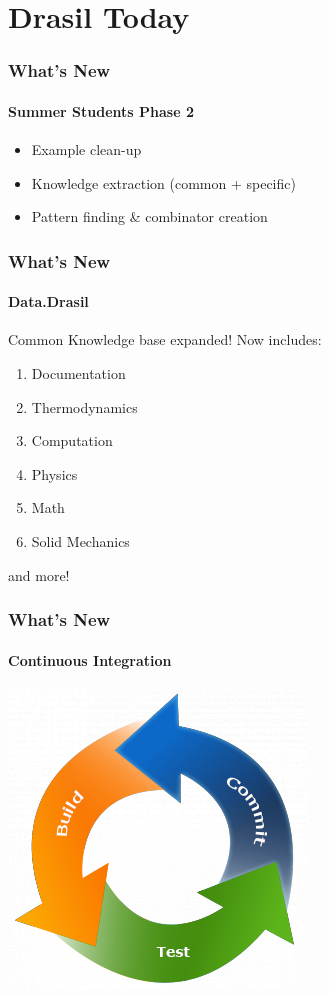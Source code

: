 \documentclass{beamer}
\begin{document}

\section[Drasil]{Drasil Today}


\begin{frame}

\frametitle{What's New}
\framesubtitle{Summer Students Phase 2}

\begin{itemize}
	\item Example clean-up
	\item Knowledge extraction (common + specific)
	\item Pattern finding \& combinator creation
\end{itemize}

\end{frame}


\begin{frame}

\frametitle{What's New}

\framesubtitle{Data.Drasil}

Common Knowledge base expanded! Now includes:
\begin{enumerate}
\item Documentation
\item Thermodynamics 
\item Computation
\item Physics
\item Math
\item Solid Mechanics
\end{enumerate}
and more!

\end{frame}


\begin{frame}

\frametitle{What's New}
\framesubtitle{Continuous Integration}

\begin{center}
\includegraphics[scale=0.5]{CI.jpg}
\end{center}

\end{frame}
\end{document}
